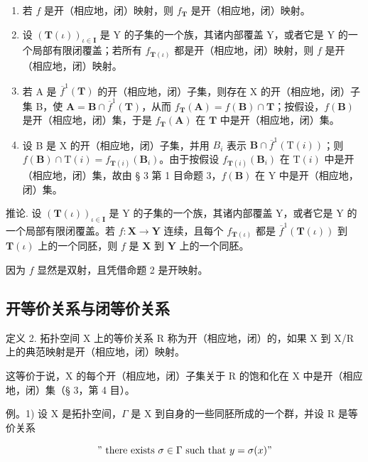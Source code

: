 \begin{enumerate}
\def\labelenumi{\alph{enumi})}
\item
  若 \(f\) 是开（相应地，闭）映射，则 \(f_{\mathbf{T}}\) 是开（相应地，闭）映射。
\item
  设 \((\mathbf{T}(\iota))_{\iota \in \mathbf{I}}\) 是 Y 的子集的一个族，其诸内部覆盖 Y，或者它是 Y 的一个局部有限闭覆盖；若所有 \(f_{\mathbf{T}(\iota)}\) 都是开（相应地，闭）映射，则 \(f\) 是开（相应地，闭）映射。
\item
  若 A 是 \(\overline{f}^{1}(\mathbf{T})\) 的开（相应地，闭）子集，则存在 X 的开（相应地，闭）子集 B，使 \(\mathbf{A} = \mathbf{B} \cap \overline{f}^{1}(\mathbf{T})\)，从而 \(f_{\mathbf{T}}(\mathbf{A}) = f(\mathbf{B}) \cap \mathbf{T}\)；按假设，\(f(\mathbf{B})\) 是开（相应地，闭）集，于是 \(f_{\mathbf{T}}(\mathbf{A})\) 在 \(\mathbf{T}\) 中是开（相应地，闭）集。
\item
  设 B 是 X 的开（相应地，闭）子集，并用 \(B_{i}\) 表示 \(\mathbf{B} \cap \overline{f}^{1}(\mathrm{T}(i))\)；则 \(f(\mathbf{B}) \cap \mathrm{T}(i) = f_{\mathbf{T}(i)}(\mathbf{B}_{i})\)。由于按假设 \(f_{\mathbf{T}(i)}(\mathbf{B}_{i})\) 在 \(\mathrm{T}(i)\) 中是开（相应地，闭）集，故由 § 3 第 1 目命题 3，\(f(\mathbf{B})\) 在 Y 中是开（相应地，闭）集。
\end{enumerate}

推论. 设 \((\mathbf{T}(\iota))_{\iota \in \mathbf{I}}\) 是 Y 的子集的一个族，其诸内部覆盖 Y，或者它是 Y 的一个局部有限闭覆盖。若 \(f: \mathbf{X} \to \mathbf{Y}\) 连续，且每个 \(f_{\mathbf{T}(\iota)}\) 都是 \(\overline{f}^1 (\mathbf{T}(\iota))\) 到 \(\mathbf{T}(\iota)\) 上的一个同胚，则 \(f\) 是 \(\mathbf{X}\) 到 \(\mathbf{Y}\) 上的一个同胚。

因为 \(f\) 显然是双射，且凭借命题 2 是开映射。

\subsection{开等价关系与闭等价关系}

定义 2. 拓扑空间 X 上的等价关系 R 称为开（相应地，闭）的，如果 X 到 X/R 上的典范映射是开（相应地，闭）映射。

这等价于说，X 的每个开（相应地，闭）子集关于 R 的饱和化在 X 中是开（相应地，闭）集（§ 3，第 4 目）。

例。1) 设 X 是拓扑空间，\(\Gamma\) 是 X 到自身的一些同胚所成的一个群，并设 R 是等价关系

\[
" \text { there   exists } \sigma \in \Gamma \text { such   that } y = \sigma (x)"
\]


